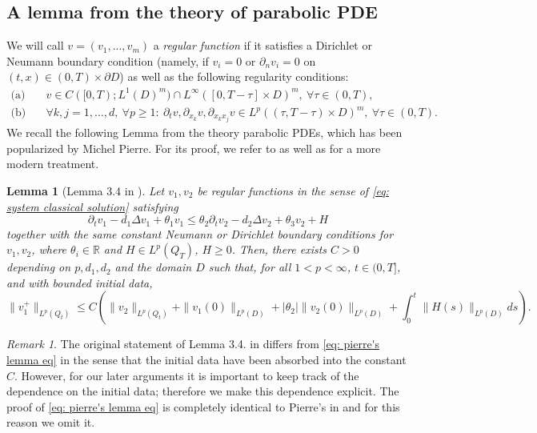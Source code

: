 \documentclass[12pt]{article}
\newtheorem{lemma}{Lemma}
\theoremstyle{definition}
\theoremstyle{remark}
\newtheorem{remark}{Remark}
\begin{document}
\subsection{A lemma from the theory of parabolic PDE}
We will call $v = (v_1,...,v_m)$ a \textit{regular function} if it satisfies a Dirichlet or Neumann boundary condition (namely, if $v_i=0$ or $\partial_n v_i = 0$ on $(t,x) \in (0,T)\times \partial D$) as well as the following regularity conditions:
\begin{equation}\label{eq: system classical solution}
\begin{aligned}
\text{(a)}\quad & v\in C([0,T); L^1(D)^m)\cap L^{\infty}([0,T-\tau]\times D)^m, \ \forall \tau\in (0,T), \\
\text{(b)}\quad & \forall k,j=1,\dots,d,\ \forall p\geq 1:\ 
\partial_tv,\partial_{x_k}v,\partial_{x_kx_j} v \in L^p((\tau,T-\tau)\times D)^m,\ \forall \tau\in (0,T).
\end{aligned}
\end{equation}
We recall the following Lemma from the theory parabolic PDEs, which has been popularized by Michel Pierre. For its proof, we refer to \cite{pierre1987global} as well as \cite{pierre2010global} for a more modern treatment.
\begin{lemma}[Lemma 3.4 in \cite{pierre2010global}]\label{lemma: Duality lemma}
Let $v_1,v_2$ be regular functions in the sense of \eqref{eq: system classical solution} satisfying
\begin{equation}\label{heat equations inequality}
\partial_t v_1 - d_1 \Delta v_1 + \theta_1 v_1 
\le \theta_2 \partial_t v_2 - d_2 \Delta v_2 + \theta_3 v_2 + H
\end{equation}
together with the same constant Neumann or Dirichlet boundary conditions for $v_1,v_2$, where $\theta_i \in \mathbb{R}$ and $H \in L^p(Q_T)$, $H \ge 0$. Then, there exists $C>0$ depending on $p,d_1,d_2$ and the domain $D$ such that, for all $1<p<\infty$, $t\in (0,T]$, 
and with bounded initial data,
\begin{equation}\label{eq: pierre's lemma eq}
\|v_1^+\|_{L^p(Q_t)} \leq C \left( \|v_2\|_{L^p(Q_t)} + \|v_1(0)\|_{L^p(D)} + |\theta_2|  \|v_2(0)\|_{L^p(D)} + \int_0^t \|H(s)\|_{L^p(D)} ds \right).
\end{equation}
\end{lemma}
\begin{remark}
    The original statement of Lemma 3.4. in \cite{pierre2010global} differs from \eqref{eq: pierre's lemma eq} in the sense that the initial data have been absorbed into the constant $C$. However, for our later arguments it is important to keep track of the dependence on the initial data; therefore we make this dependence explicit. The proof of \eqref{eq: pierre's lemma eq} is completely identical to Pierre's in \cite{pierre2010global} and for this reason we omit it.
\end{remark}
\end{document}
